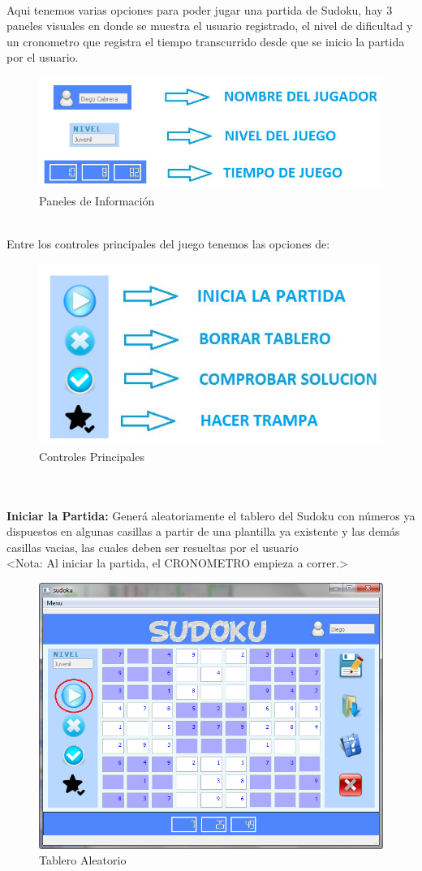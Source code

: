 \ \\ Aqui tenemos varias opciones para poder jugar una partida de Sudoku, hay 3 paneles visuales en donde se muestra el usuario registrado, el nivel de dificultad y un cronometro que registra el tiempo transcurrido desde que se inicio la partida por el usuario.

\begin{figure}[htbp]
\begin{center}
\includegraphics[width=.35\textwidth]{./imagenes/Panel.png}
\caption{Paneles de Información}
\label{Paneles de Información}
\end{center}
\end{figure} 

\ \\ Entre los controles principales del juego tenemos las opciones de: 

\begin{figure}[htbp]
\begin{center}
\includegraphics[width=.40\textwidth]{./imagenes/Controles1.png}
\caption{Controles Principales}
\label{Controles Principales}
\end{center}
\end{figure} 

\ \\ \ \\ \textbf{Iniciar la Partida:} Generá aleatoriamente el tablero del Sudoku con números ya dispuestos en algunas casillas a partir de una plantilla ya existente y las demás casillas vacias, las cuales deben ser resueltas por el usuario \\ <Nota: Al iniciar la partida, el CRONOMETRO empieza a correr.>  

\begin{figure}[htbp]
\begin{center}
\includegraphics[width=.50\textwidth]{./imagenes/Tablero.png}
\caption{Tablero Aleatorio}
\label{Tablero}
\end{center}
\end{figure} 


